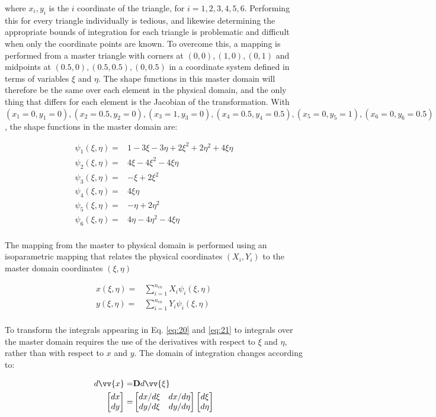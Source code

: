 \documentclass[10pt]{article}
\newcommand{\beqa}{\begin{equation}\begin{aligned}}
\newcommand{\eeqa}{\end{aligned}\end{equation}}
\begin{document}
where \(x_i, y_i\) is the \(i\) coordinate of the triangle, for \(i=1, 2, 3, 4, 5, 6\). Performing this for every triangle individually is tedious, and likewise determining the appropriate bounds of integration for each triangle is problematic and difficult when only the coordinate points are known. To overcome this, a mapping is performed from a master triangle with corners at \((0,0), (1,0), (0,1)\) and midpoints at \((0.5,0), (0.5,0.5), (0,0.5)\) in a coordinate system defined in terms of variables \(\xi\) and \(\eta\). The shape functions in this master domain will therefore be the same over each element in the physical domain, and the only thing that differs for each element is the Jacobian of the transformation. With \((x_1=0, y_1=0), (x_2=0.5, y_2=0), (x_3=1,y_3=0), (x_4=0.5,y_4=0.5), (x_5=0,y_5=1), (x_6=0,y_6=0.5)\), the shape functions in the master domain are:

\beqa
\psi_1(\xi,\eta)=&1-3\xi-3\eta+2\xi^2+2\eta^2+4\xi\eta\\
\psi_2(\xi,\eta)=&4\xi-4\xi^2-4\xi\eta\\
\psi_3(\xi,\eta)=&-\xi+2\xi^2\\
\psi_4(\xi,\eta)=&4\xi\eta\\
\psi_5(\xi,\eta)=&-\eta+2\eta^2\\
\psi_6(\xi,\eta)=&4\eta-4\eta^2-4\xi\eta\\
\eeqa

The mapping from the master to physical domain is performed using an isoparametric mapping that relates the physical coordinates \((X_i,Y_i)\) to the master domain coordinates \((\xi,\eta)\)

\beqa
x(\xi,\eta)=&\sum_{i=1}^{n_{en}}X_i\psi_i(\xi,\eta)\\
y(\xi,\eta)=&\sum_{i=1}^{n_{en}}Y_i\psi_i(\xi,\eta)\\
\eeqa

To transform the integrals appearing in Eq. \eqref{eq:20} and \eqref{eq:21} to integrals over the master domain requires the use of the derivatives with respect to \(\xi\) and \(\eta\), rather than with respect to \(x\) and \(y\). The domain of integration changes according to:

\beqa
d\vv{x}=&\textbf{D}d\vv{\xi}\\
\begin{bmatrix}dx\\dy\end{bmatrix}=&
\begin{bmatrix}dx/d\xi & dx/d\eta\\ dy/d\xi & dy/d\eta\end{bmatrix}
\begin{bmatrix}d\xi\\d\eta\end{bmatrix}
\eeqa
\end{document}
